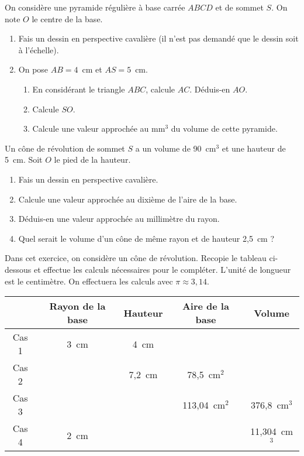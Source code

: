 \begin{Exo}
On considère une pyramide régulière à base carrée $ABCD$ et de sommet
$S$. On note $O$ le centre de la base.
\begin{enumerate}
\item Fais un dessin en perspective cavalière (il n'est pas demandé
  que le dessin soit à l'échelle).
\item On pose $AB=4$~cm et $AS=5$~cm.
\begin{enumerate}
\item En considérant le triangle $ABC$, calcule $AC$. Déduis-en $AO$.
\item Calcule $SO$.
\item Calcule une valeur approchée au mm$^3$ du volume de cette
  pyramide.
\end{enumerate}
\end{enumerate}
\end{Exo}

\begin{Exo}
Un cône de révolution de sommet $S$ a un volume de 90~cm$^3$ et une hauteur de 5~cm. Soit $O$ le pied de la hauteur.
\begin{enumerate}
\item Fais un dessin en perspective cavalière.
\item Calcule une valeur approchée au dixième de l'aire de la base.
\item Déduis-en une valeur approchée au millimètre du rayon.
\item Quel serait le volume d'un cône de même rayon et de hauteur 2,5~cm ?
\end{enumerate}
\end{Exo}

\begin{Exo}
Dans cet exercice, on considère un cône de révolution. Recopie le tableau ci-dessous et effectue les calculs nécessaires pour le compléter. L'unité de longueur est le centimètre. On effectuera les calculs avec $\pi\approx3,14$.
\begin{center}
  \begin{tabular}{|c|c|c|c|c|}
\cline{2-5}
\multicolumn{1}{c|}{}&Rayon de la base&Hauteur&Aire de la base&Volume\\
\hline
Cas 1&3~cm&4~cm&&\\
\hline
Cas 2&&7,2~cm&78,5~cm$^2$&\\
\hline
Cas 3&&&113,04~cm$^2$&376,8~cm$^3$\\
\hline
Cas 4&2~cm&&&11,304~cm$^3$\\
\hline
  \end{tabular}
\end{center}
\end{Exo}

